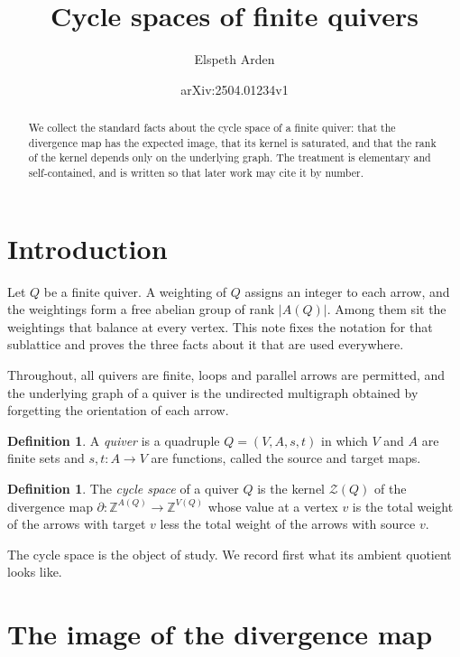 \documentclass[11pt]{article}
\title{Cycle spaces of finite quivers}
\author{Elspeth Arden}
\date{arXiv:2504.01234v1}
\theoremstyle{plain}
\theoremstyle{definition}
\newtheorem{definition}[theorem]{Definition}
\theoremstyle{remark}
\newcommand{\ZZ}{\mathbb{Z}}
\newcommand{\Zc}{\mathcal{Z}}
\begin{document}
\maketitle

\begin{abstract}
We collect the standard facts about the cycle space of a finite quiver: that the divergence map has the expected image, that its kernel is saturated, and that the rank of the kernel depends only on the underlying graph. The treatment is elementary and self-contained, and is written so that later work may cite it by number.
\end{abstract}

\section{Introduction}

Let $Q$ be a finite quiver. A weighting of $Q$ assigns an integer to each arrow, and the weightings form a free abelian group of rank $|A(Q)|$. Among them sit the weightings that balance at every vertex. This note fixes the notation for that sublattice and proves the three facts about it that are used everywhere.

Throughout, all quivers are finite, loops and parallel arrows are permitted, and the underlying graph of a quiver is the undirected multigraph obtained by forgetting the orientation of each arrow.

\begin{definition}\label{def:quiver}
A \emph{quiver} is a quadruple $Q = (V, A, s, t)$ in which $V$ and $A$ are finite sets and $s, t \colon A \to V$ are functions, called the source and target maps.
\end{definition}

\begin{definition}\label{def:cycle-space}
The \emph{cycle space} of a quiver $Q$ is the kernel $\Zc(Q)$ of the divergence map $\partial \colon \ZZ^{A(Q)} \to \ZZ^{V(Q)}$ whose value at a vertex $v$ is the total weight of the arrows with target $v$ less the total weight of the arrows with source $v$.
\end{definition}

The cycle space is the object of study. We record first what its ambient quotient looks like.

\section{The image of the divergence map}
\end{document}
